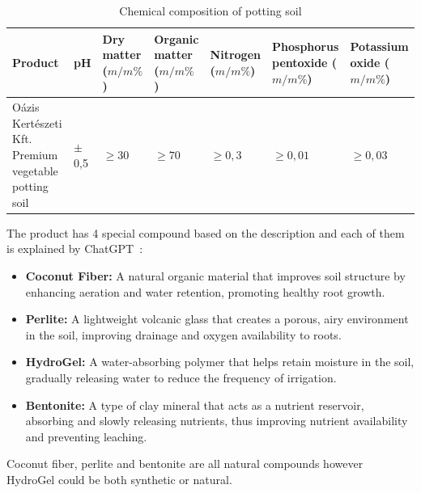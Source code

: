 \documentclass[a4paper,12pt]{article}
\begin{document}
\begin{table}[h!]
	\centering
	\begin{tabularx}{\textwidth}{|>{\centering\arraybackslash}p{3cm}|>{\centering\arraybackslash}p{1cm}|>{\centering\arraybackslash}p{1.5cm}|>{\centering\arraybackslash}p{1.5cm}|>{\centering\arraybackslash}p{1.5cm}|>{\centering\arraybackslash}p{2cm}|>{\centering\arraybackslash}p{2cm}|}
		\hline
		Product & pH & Dry matter ($m/m\%$) & Organic matter ($m/m\%$) & Nitrogen ($m/m\%$) & Phosphorus pentoxide ($m/m\%$) & Potassium oxide ($m/m\%$) \\
		\hline
		Oázis Kertészeti Kft. Premium vegetable potting soil & 6$\pm$0,5 & $\geq30$ & $\geq70$& $\geq0,3$ & $\geq0,01$ & $\geq0,03$ \\
		\hline
	\end{tabularx}
	\caption{Chemical composition of potting soil}
	\label{tab:example}
\end{table}

The product has 4 special compound based on the description and each of them is \cite{oazis} explained by ChatGPT~\cite{chatgpt}:

\begin{itemize}
	\item \textbf{Coconut Fiber:}  
	A natural organic material that improves soil structure by enhancing aeration and water retention, promoting healthy root growth.
	
	\item \textbf{Perlite:}  
	A lightweight volcanic glass that creates a porous, airy environment in the soil, improving drainage and oxygen availability to roots.
	
	\item \textbf{HydroGel:}  
	A water-absorbing polymer that helps retain moisture in the soil, gradually releasing water to reduce the frequency of irrigation.
	
	\item \textbf{Bentonite:}  
	A type of clay mineral that acts as a nutrient reservoir, absorbing and slowly releasing nutrients, thus improving nutrient availability and preventing leaching.
\end{itemize}

Coconut fiber, perlite and bentonite are all natural compounds however HydroGel could be both synthetic or natural.











\printbibliography
\end{document}
